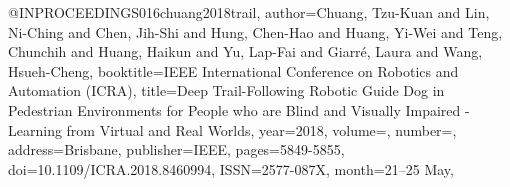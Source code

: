 @INPROCEEDINGS{016chuang2018trail,
author={Chuang, Tzu-Kuan and Lin, Ni-Ching and Chen, Jih-Shi and Hung, Chen-Hao and Huang, Yi-Wei and Teng, Chunchih and Huang, Haikun and Yu, Lap-Fai and Giarré, Laura and Wang, Hsueh-Cheng},
booktitle={IEEE International Conference on Robotics and Automation (ICRA)}, 
title={Deep Trail-Following Robotic Guide Dog in Pedestrian Environments for People who are Blind and Visually Impaired - Learning from Virtual and Real Worlds}, 
year={2018},
volume={},
number={},
address={Brisbane},
publisher={IEEE},
pages={5849-5855},
doi={10.1109/ICRA.2018.8460994},
ISSN={2577-087X},
month={21--25 May},}